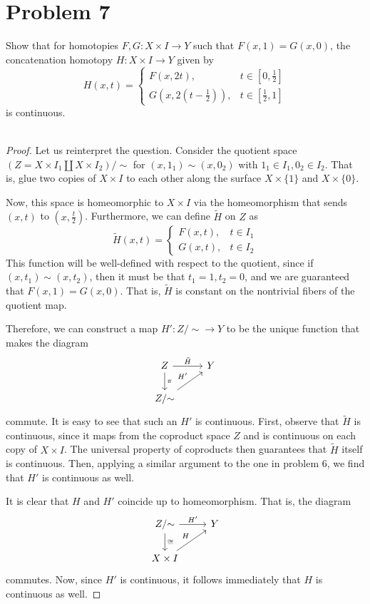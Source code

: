 \documentclass[fontsize=11pt]{scrartcl} %
\numberwithin{equation}{section} %
\numberwithin{figure}{section} %
\numberwithin{table}{section} %
\begin{document}
\section*{Problem 7}
Show that for homotopies $F,G:X\times I \to Y$ such that $F(x,1) = G(x,0)$, the
concatenation homotopy $H:X\times I\to Y$ given by
\[
    H(x,t) =
    \begin{cases}
        F(x,2t), & t\in[0,\frac{1}{2}]\\
        G(x,2(t-\frac{1}{2})), &t\in [\frac{1}{2},1]
    \end{cases}
\]
is continuous.
\\
\\
\begin{proof}
    Let us reinterpret the question. Consider the
    quotient space $(Z = X\times I_1 \coprod X\times I_2)/{\sim}$ for
    $(x,1_1)\sim(x,0_2)$ with $1_1\in I_1, 0_2\in I_2$. That is, glue two copies
    of $X\times I$ to each other along the surface $X\times\{1\}$ and
    $X\times\{0\}$.

    Now, this space is homeomorphic to $X\times I$ via the homeomorphism that
    sends $(x,t)$ to $(x,\frac{t}{2})$. Furthermore, we can define $\tilde{H}$ on
    $Z$ as
    \[
        \tilde{H}(x,t) = 
        \begin{cases}
            F(x,t), &t\in I_1\\
            G(x,t), &t\in I_2
        \end{cases}
    \]
    This function will be well-defined with respect to the quotient, since if
    $(x,t_1)\sim(x,t_2)$, then it must be that $t_1=1,t_2=0$, and we are
    guaranteed that $F(x,1)=G(x,0)$. That is, $\tilde{H}$ is constant on the nontrivial
    fibers of the quotient map.
    
    Therefore, we can construct a map $H':Z/{\sim}\to Y$ to be the unique
    function that makes the diagram
    \[
        \begin{tikzcd}
            Z\arrow{r}{\tilde{H}}\arrow{d}{\pi} &Y\\
            Z/{\sim}\arrow{ur}{H'}
        \end{tikzcd}
    \]
    commute. It is easy to see that such an $H'$ is continuous. First, observe
    that $\tilde{H}$ is continuous, since it maps from the coproduct space $Z$
    and is continuous on each copy of $X\times I$. The universal property of
    coproducts then guarantees that $\tilde{H}$ itself is continuous.
    Then, applying a similar argument to the one in problem 6, we find that $H'$
    is continuous as well.

    It is clear that $H$ and $H'$ coincide up to homeomorphism.
    That is, the diagram
    \[
        \begin{tikzcd}
            Z/{\sim}\arrow{r}{H'}\arrow{d}{\cong} &Y\\
            X\times I \arrow{ru}{H}
        \end{tikzcd}
    \]
    commutes. Now, since $H'$ is continuous, it follows immediately that $H$ is
    continuous as well.

    
\end{proof}
\end{document}
